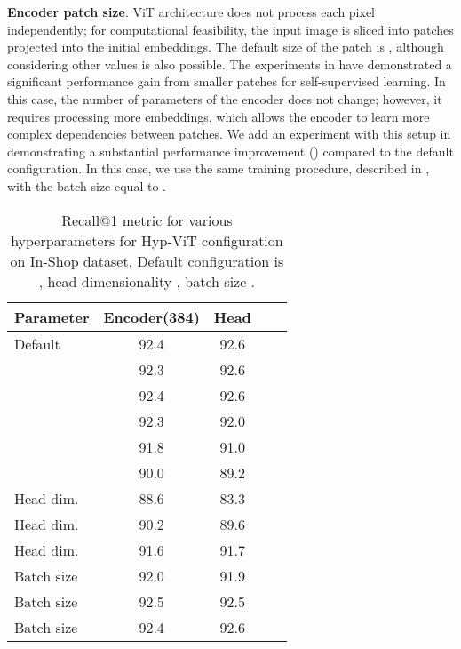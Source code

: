 \documentclass[10pt,twocolumn,letterpaper]{article}
\begin{document}
{\bf Encoder patch size}. ViT architecture does not process each pixel independently; for computational feasibility, the input image is sliced into patches projected into the initial embeddings. The default size of the patch is , although considering other values is also possible. The experiments in \cite{dino} have demonstrated a significant performance gain from smaller  patches for self-supervised learning. In this case, the number of parameters of the encoder does not change; however, it requires processing  more embeddings, which allows the encoder to learn more complex dependencies between patches. We add an experiment with this setup in  demonstrating a substantial performance improvement () compared to the default configuration. In this case, we use the same training procedure, described in , with the batch size equal to .

\setlength{\tabcolsep}{1em}
\begin{table}
  \centering
  \begin{tabular}{l|cccc}
    \toprule
    Parameter & Encoder(384) & Head \\
    \midrule
    Default & 92.4 & 92.6 \\
    \midrule
     & 92.3 & 92.6 \\
     & 92.4 & 92.6 \\
     & 92.3 & 92.0 \\
     & 91.8 & 91.0 \\
     & 90.0 & 89.2 \\
    \midrule
    Head dim.  & 88.6 & 83.3 \\
    Head dim.  & 90.2 & 89.6 \\
    Head dim.  & 91.6 & 91.7 \\
    \midrule
    Batch size   & 92.0 & 91.9 \\
    Batch size   & 92.5 & 92.5 \\
    Batch size  & 92.4 & 92.6 \\
    \bottomrule
  \end{tabular}
  \caption{Recall@1 metric for various hyperparameters for Hyp-ViT configuration on In-Shop dataset. Default configuration is , head dimensionality , batch size . }
  \label{tab:exp_param}
  \vspace{-0.6cm}
\end{table}
\end{document}
